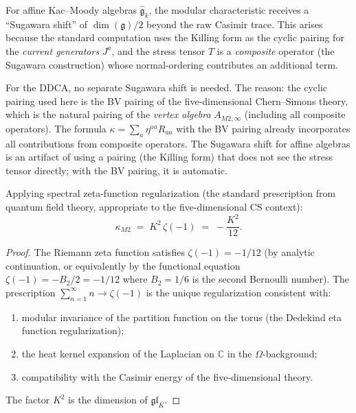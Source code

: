 \documentclass[11pt]{article}
\newcommand{\fg}{\mathfrak{g}}
\newcommand{\C}{\mathbb{C}}
\begin{document}
\begin{remark}
\label{rem:no-sugawara-shift}
For affine Kac--Moody algebras $\widehat{\fg}_k$, the modular
characteristic receives a ``Sugawara shift'' of $\dim(\fg)/2$
beyond the raw Casimir trace.  This arises because the standard
computation uses the Killing form as the cyclic pairing for the
\emph{current generators} $J^a$, and the stress tensor $T$ is
a \emph{composite} operator (the Sugawara construction) whose
normal-ordering contributes an additional term.

For the DDCA, no separate Sugawara shift is needed.  The reason:
the cyclic pairing used here is the BV pairing of the
five-dimensional Chern--Simons theory, which is the natural
pairing of the \emph{vertex algebra} $A_{M2,\infty}$ (including
all composite operators).  The formula
$\kappa = \sum_a \eta^{aa} R_{aa}$ with the BV pairing already
incorporates all contributions from composite operators.  The
Sugawara shift for affine algebras is an artifact of using a
pairing (the Killing form) that does not see the stress tensor
directly; with the BV pairing, it is automatic.
\end{remark}

\begin{theorem}
\label{thm:kappa-m2-zeta}
Applying spectral zeta-function regularization
(the standard prescription from quantum field theory,
appropriate to the five-dimensional CS context):
\begin{equation}\label{eq:kappa-m2-regularized}
\boxed{
\kappa_{M2}
\;=\;
K^2\, \zeta(-1)
\;=\;
-\frac{K^2}{12}.
}
\end{equation}
\end{theorem}

\begin{proof}
The Riemann zeta function satisfies $\zeta(-1) = -1/12$
(by analytic continuation, or equivalently by the functional
equation $\zeta(-1) = -B_2/2 = -1/12$ where $B_2 = 1/6$
is the second Bernoulli number).  The prescription
$\sum_{n=1}^\infty n \to \zeta(-1)$ is the unique
regularization consistent with:
\begin{enumerate}[label=(\roman*)]
\item modular invariance of the partition function on the torus
  (the Dedekind eta function regularization);
\item the heat kernel expansion of the Laplacian on $\C$ in the
  $\Omega$-background;
\item compatibility with the Casimir energy of the
  five-dimensional theory.
\end{enumerate}
The factor $K^2$ is the dimension of $\mathfrak{gl}_K$.
\end{proof}
\end{document}
